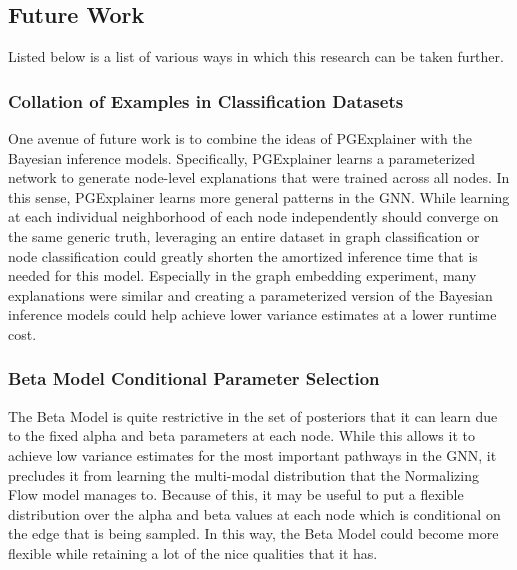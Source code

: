\subsection{Future Work}
Listed below is a list of various ways in which this research can be taken further. 

\subsubsection{Collation of Examples in Classification Datasets}
One avenue of future work is to combine the ideas of PGExplainer \cite{luo_parameterized_2020} with the Bayesian inference models. Specifically, PGExplainer learns a parameterized network to generate node-level explanations that were trained across all nodes. In this sense, PGExplainer learns more general patterns in the GNN. While learning at each individual neighborhood of each node independently should converge on the same generic truth, leveraging an entire dataset in graph classification or node classification could greatly shorten the amortized inference time that is needed for this model. Especially in the graph embedding experiment, many explanations were similar and creating a parameterized version of the Bayesian inference models could help achieve lower variance estimates at a lower runtime cost.

\subsubsection{Beta Model Conditional Parameter Selection}
The Beta Model is quite restrictive in the set of posteriors that it can learn due to the fixed alpha and beta parameters at each node. While this allows it to achieve low variance estimates for the most important pathways in the GNN, it precludes it from learning the multi-modal distribution that the Normalizing Flow model manages to. Because of this, it may be useful to put a flexible distribution over the alpha and beta values at each node which is conditional on the edge that is being sampled. In this way, the Beta Model could become more flexible while retaining a lot of the nice qualities that it has. 

